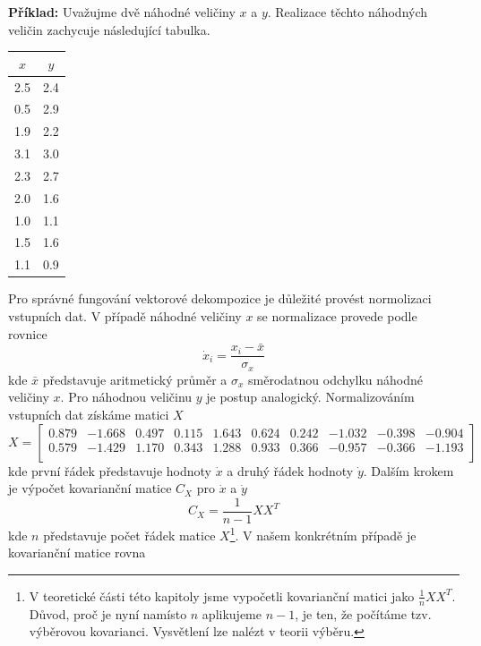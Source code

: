 \documentclass[a4paper]{book}
\begin{document}
\noindent \textbf{Příklad:} Uvažujme dvě náhodné veličiny $x$ a $y$. Realizace těchto náhodných veličin zachycuje následující tabulka.
\begin{center}
     \begin{tabular}{c | c}
     $x$ & $y$ \\
     \hline
     2.5 & 2.4 \\
     0.5 & 2.9 \\
     1.9 & 2.2 \\
     3.1 & 3.0 \\
     2.3 & 2.7 \\
     2.0 & 1.6 \\
     1.0 & 1.1 \\
     1.5 & 1.6 \\
     1.1 & 0.9 \\
     \end{tabular}
\end{center}
Pro správné fungování vektorové dekompozice je důležité provést normolizaci vstupních dat. V případě náhodné veličiny $x$ se normalizace provede podle rovnice
\begin{equation*}
\dot{x}_i = \frac{x_i - \bar{x}}{\sigma_x}
\end{equation*}
kde $\bar{x}$ představuje aritmetický průměr a $\sigma_x$ směrodatnou odchylku náhodné veličiny $x$. Pro náhodnou veličinu $y$ je postup analogický. Normalizováním vstupních dat získáme matici $X$
\begin{equation*}
     X =
     \begin{bmatrix}
     0.879 & -1.668 & 0.497 & 0.115 & 1.643 & 0.624 & 0.242 & -1.032 & -0.398 & -0.904 \\
     0.579 & -1.429 & 1.170 & 0.343 & 1.288 & 0.933 & 0.366 & -0.957 & -0.366 & -1.193 \\
     \end{bmatrix}
\end{equation*}
kde první řádek představuje hodnoty $\dot{x}$ a druhý řádek hodnoty $\dot{y}$. Dalším krokem je výpočet kovarianční matice $C_X$ pro $\dot{x}$ a $\dot{y}$
\begin{equation*}
C_X = \frac{1}{n-1}XX^T
\end{equation*}
kde $n$ představuje počet řádek matice $X$\footnote{V teoretické části této kapitoly jsme vypočetli kovarianční matici jako $\frac{1}{n}XX^T$. Důvod, proč je nyní namísto $n$ aplikujeme $n-1$, je ten, že počítáme tzv. výběrovou kovarianci. Vysvětlení lze nalézt v teorii výběru.}. V našem konkrétním případě je kovarianční matice rovna
\end{document}
